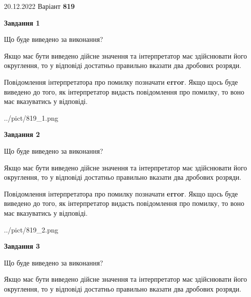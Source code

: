 \documentclass[12pt, ukrainian]{article}
\begin{document}
{20.12.2022 Варіант \No \textbf { 819 }\par}
{
\begin {Large}

{\begin {center}\textbf{Завдання 1}\end {center}}\par
Що буде виведено за виконання? \par

Якщо має бути виведено дійсне значення та інтерпретатор має здійснювати його округлення, 
то у відповіді достатньо правильно вказати два дробових розряди.

Повідомлення інтерпретатора про помилку позначати \textbf{error}.
Якщо щось буде виведено до того, як інтерпретатор видасть повідомлення про помилку, 
то воно має вказуватись у відповіді. \par

\begin{center}
	{../pict/819_1.png}
\end{center}
\newpage

{\begin {center}\textbf{Завдання 2}\end {center}}\par
Що буде виведено за виконання? \par

Якщо має бути виведено дійсне значення та інтерпретатор має здійснювати його округлення, 
то у відповіді достатньо правильно вказати два дробових розряди.

Повідомлення інтерпретатора про помилку позначати \textbf{error}.
Якщо щось буде виведено до того, як інтерпретатор видасть повідомлення про помилку, 
то воно має вказуватись у відповіді. \par

\begin{center}
	{../pict/819_2.png}
\end{center}
\newpage

{\begin {center}\textbf{Завдання 3}\end {center}}\par
Що буде виведено за виконання? \par

Якщо має бути виведено дійсне значення та інтерпретатор має здійснювати його округлення, 
то у відповіді достатньо правильно вказати два дробових розряди.


\end{Large}}
\end{document}
